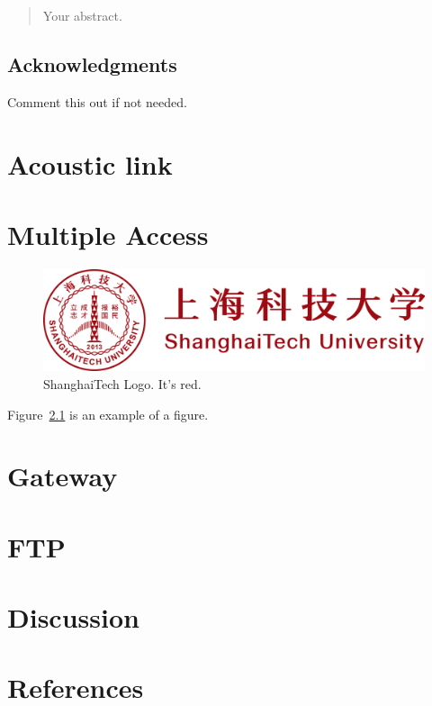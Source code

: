\documentclass[12pt,twoside]{report}
\date{September 2015}
\begin{document}



\clearpage{\pagestyle{empty}\cleardoublepage}
\setcounter{page}{1}
\pagestyle{fancy}

\begin{abstract}
  Your abstract.
\end{abstract}

\cleardoublepage
\section*{Acknowledgments}
Comment this out if not needed.

\clearpage{\pagestyle{empty}\cleardoublepage}

\tableofcontents


\clearpage{\pagestyle{empty}\cleardoublepage}
\setcounter{page}{1}
\fancyhead[LE,RO]{\slshape \rightmark}
\fancyhead[LO,RE]{\slshape \leftmark}





\chapter{Acoustic link}



\chapter{Multiple Access}

\begin{figure}[tb]
  \centering
  \includegraphics[width = 0.4\hsize]{./figures/shanghaitech.pdf}
  \caption{ShanghaiTech Logo. It's red.}
  \label{fig:logo}
\end{figure}

Figure~\ref{fig:logo} is an example of a figure.


\chapter{Gateway}


\chapter{FTP}


\chapter{Discussion}

\chapter{References}


\end{document}
